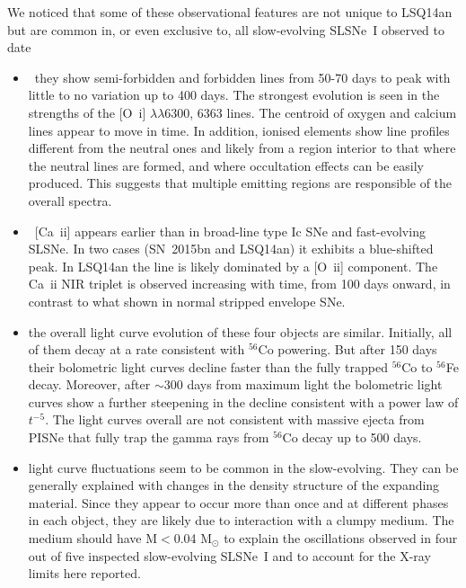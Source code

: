 \documentclass[useAMS,usenatbib]{mn2e}
\def\co{$^{56}$Co}
\def\fe{$^{56}$Fe}
\def\M{M$_{\odot}$}
\def\an{LSQ14an}
\begin{document}
We noticed that some of these observational features are not unique to \an\/ but are common in, or even exclusive to, all slow-evolving SLSNe~I observed to date 
\begin{itemize}
\item~they show semi-forbidden and forbidden lines from 50-70 days to peak with little  to no variation up to 400 days.
The strongest evolution is seen in the strengths of the [O~{\sc i}] $\lambda\lambda$6300, 6363 lines. 
The centroid of oxygen and calcium lines appear to move in time. In addition, ionised elements show line profiles different from the neutral ones and likely from a region interior to that where the neutral lines are formed, and where occultation effects can be easily produced. This suggests that multiple emitting regions are responsible of the overall spectra. 
\item~[Ca~{\sc ii}] appears earlier than in broad-line type Ic SNe and fast-evolving SLSNe. In two cases (SN~2015bn and \an\/) it exhibits a blue-shifted  peak.  In 
 \an\/ the line is likely dominated by a [O~{\sc ii}] component. The Ca~{\sc ii} NIR triplet is observed increasing with time, from 100 days onward, in contrast to what shown in normal stripped envelope SNe. 
\item the overall light curve evolution of these four objects are similar. Initially, all of them decay at a rate consistent with 
  \co\/ powering. But after 150 days their bolometric light curves decline faster than the fully trapped \co\/ to \fe\/ decay.
Moreover, after $\sim$300 days from maximum light the bolometric light curves show a further steepening in the decline consistent with a power law of $t^{-5}$.  
The light curves overall are not consistent with 
massive ejecta from PISNe that fully trap the gamma rays from \co\/ decay up to 500 days.
\item light curve fluctuations seem to be common in the slow-evolving. They can be generally explained with changes in the density structure of the expanding material. Since they appear to 
occur more than once and at different phases in each object, they are likely due to interaction with a clumpy medium. The medium should have M$<$0.04 \M\/ to explain the oscillations observed in four out of five inspected slow-evolving SLSNe~I and to account for the X-ray limits here reported. 

\end{itemize} 
\end{document}
